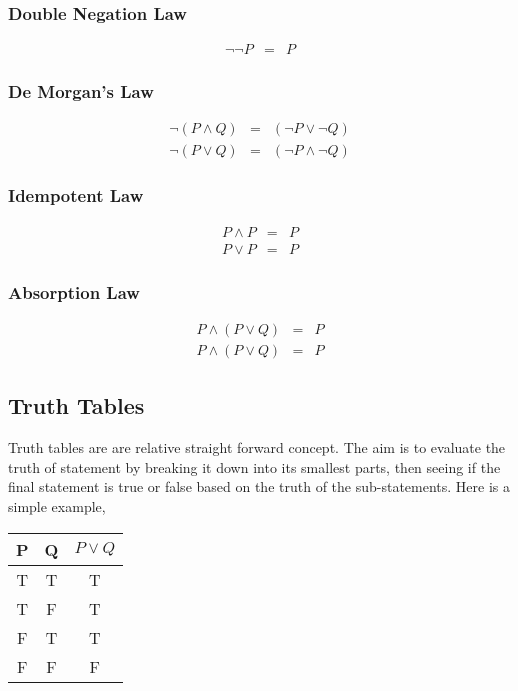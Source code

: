 \documentclass{article}
\begin{document}
\subsubsection{Double Negation Law}
\begin{eqnarray}
    \neg \neg P &=& P
\end{eqnarray}
\subsubsection{De Morgan's Law}
\begin{eqnarray}
    \neg(P \land Q) &=& (\neg P \lor \neg Q) \\
    \neg(P \lor Q) &=& (\neg P \land \neg Q)
\end{eqnarray}
\subsubsection{Idempotent Law}
\begin{eqnarray}
    P \land P &=& P \\
    P \lor P &=& P
\end{eqnarray}
\subsubsection{Absorption Law}
\begin{eqnarray}
    P \land (P \lor Q) &=& P \\
    P \land (P \lor Q) &=& P 
\end{eqnarray}

\subsection{Truth Tables}
Truth tables are are relative straight forward concept. The aim is
to evaluate the truth of statement by breaking it down into its
smallest parts, then seeing if the final statement is true or false
based on the truth of the sub-statements. Here is a simple example,
\begin{center}
    \begin{tabular}{c | c | c}
        P & Q & $P \lor Q$ \\
        \hline
        T & T & T \\
        T & F & T \\
        F & T & T \\
        F & F & F \\
    \end{tabular}
\end{center}
\end{document}

